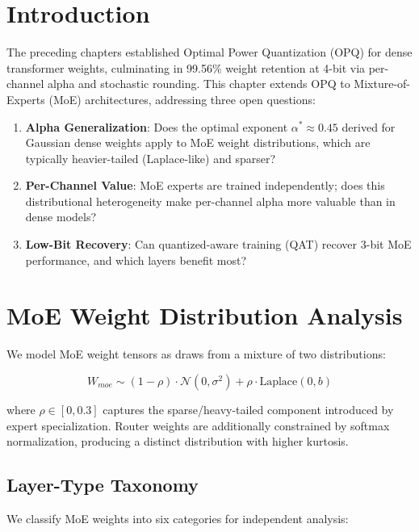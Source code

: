 
\section{Introduction}

The preceding chapters established Optimal Power Quantization (OPQ) for dense
transformer weights, culminating in 99.56\% weight retention at 4-bit via
per-channel alpha and stochastic rounding. This chapter extends OPQ to
Mixture-of-Experts (MoE) architectures, addressing three open questions:

\begin{enumerate}
\item \textbf{Alpha Generalization}: Does the optimal exponent $\alpha^* \approx 0.45$
derived for Gaussian dense weights apply to MoE weight distributions, which are
typically heavier-tailed (Laplace-like) and sparser?
\item \textbf{Per-Channel Value}: MoE experts are trained independently; does this
distributional heterogeneity make per-channel alpha more valuable than in dense models?
\item \textbf{Low-Bit Recovery}: Can quantized-aware training (QAT) recover 3-bit
MoE performance, and which layers benefit most?
\end{enumerate}

\section{MoE Weight Distribution Analysis}

We model MoE weight tensors as draws from a mixture of two distributions:

\[
W_{moe} \sim (1 - \rho) \cdot \mathcal{N}(0, \sigma^2) + \rho \cdot \text{Laplace}(0, b)
\]

where $\rho \in [0, 0.3]$ captures the sparse/heavy-tailed component introduced by
expert specialization. Router weights are additionally constrained by softmax
normalization, producing a distinct distribution with higher kurtosis.

\subsection{Layer-Type Taxonomy}

We classify MoE weights into six categories for independent analysis:

